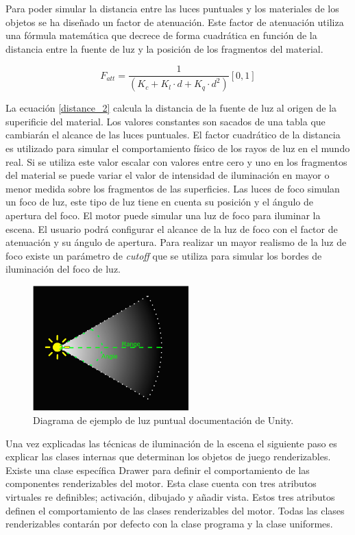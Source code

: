 \documentclass[a4paper]{book}
\begin{document}
Para poder simular la distancia entre las luces puntuales y los materiales de los objetos se ha diseñado un factor de atenuación. Este factor
de atenuación utiliza una fórmula matemática que decrece de forma cuadrática en función de la distancia entre la fuente de luz y la posición
de los fragmentos del material.

\begin{equation} \label{distance_2}
F_{att} = \frac{1} {(K_{c} + K_{l} \cdot d + K_{q} \cdot d^2)} [0 , 1]
\end{equation}

La ecuación \ref{distance_2} calcula la distancia de la fuente de luz al origen de la superificie del material. Los valores constantes son
sacados de una tabla que cambiarán el alcance de las luces puntuales. El factor cuadrático de la distancia es
utilizado para simular el comportamiento físico de los rayos de luz en el mundo real. Si se utiliza este valor escalar con valores entre
cero y uno en los fragmentos del material se puede variar el valor de intensidad de iluminación en mayor o menor medida sobre los fragmentos
de las superficies. Las luces de foco simulan un foco de luz, este tipo de luz tiene en cuenta su posición y el ángulo de apertura
del foco. El motor puede simular una luz de foco para iluminar la escena. El usuario podrá configurar el alcance
de la luz de foco con el factor de atenuación y su ángulo de apertura. Para realizar un mayor realismo de la
luz de foco existe un parámetro de \textit{cutoff} que se utiliza para simular los bordes de iluminación
del foco de luz. \cite{unity:_unity_book} \cite{opengl:_learn_opengl}

\begin{figure}[H]
    \centering
    \includegraphics[width=6cm, keepaspectratio]{img/SpotLightDiagram.png}
    \caption{Diagrama de ejemplo de luz puntual documentación de Unity.}
    \label{SpotLightDiagram}
\end{figure}

Una vez explicadas las técnicas de iluminación de la escena el siguiente paso es explicar las clases internas
que determinan los objetos de juego renderizables. Existe una clase específica Drawer para definir el comportamiento
de las componentes renderizables del motor. Esta clase cuenta con tres atributos virtuales re definibles; activación,
dibujado y añadir vista. Estos tres atributos definen el comportamiento de las clases renderizables del motor. Todas
las clases renderizables contarán por defecto con la clase programa y la clase uniformes.
\end{document}

